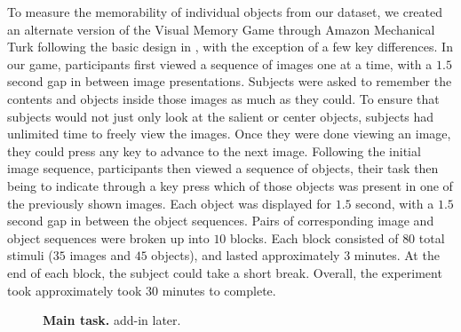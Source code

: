 To measure the memorability of individual objects from our dataset, we created an alternate version of the Visual Memory Game through Amazon Mechanical Turk following the basic design in \cite{isola11}, with the exception of a few key differences. In our game, participants first viewed a sequence of images one at a time, with a $1.5$ second gap in between image presentations. Subjects were asked to remember the contents and objects inside those images as much as they could. To ensure that subjects would not just only look at the salient or center objects, subjects had unlimited time to freely view the images. Once they were done viewing an image, they could press any key to advance to the next image. Following the initial image sequence, participants then viewed a sequence of objects, their task then being to indicate through a key press which of those objects was present in one of the previously shown images. Each object was displayed for $1.5$ second, with a $1.5$ second gap in between the object sequences. Pairs of corresponding image and object sequences were broken up into $10$ blocks. Each block consisted of $80$ total stimuli ($35$ images and $45$ objects), and lasted approximately $3$ minutes. At the end of each block, the subject could take a short break. Overall, the experiment took approximately took $30$ minutes to complete.

\begin{figure}[t]
\centering
{}
\vspace{-5mm}\caption{\footnotesize\textbf{Main task.} add-in later. }\label{fig:mainTask}
\end{figure}

